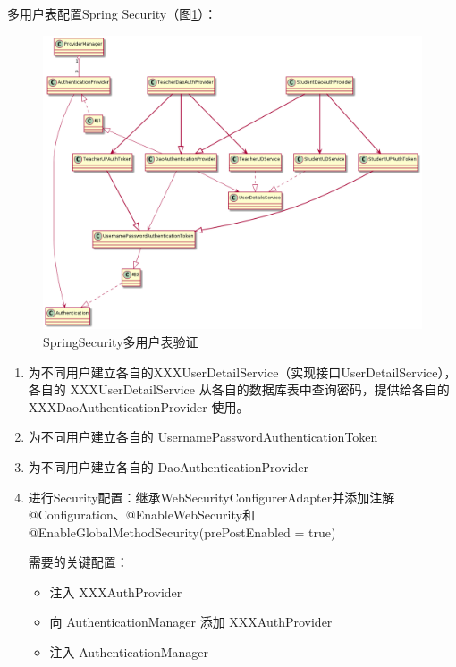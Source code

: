 多用户表配置Spring Security（图\ref{SpringSecurityMultiUser}）：

\begin{figure}[htbp]
  \centering
  \includegraphics[scale = 0.35]{out/uml/类图/Spring Security/SpringSecurity多用户表验证/SpringSecurity多用户表验证.png}
  \caption{\song\wuhao SpringSecurity多用户表验证}
  \label{SpringSecurityMultiUser}
\end{figure}

\begin{enumerate}[label=\circled{\arabic*}]
  \item 为不同用户建立各自的XXXUserDetailService（实现接口UserDetailService），各自的 XXXUserDetailService 从各自的数据库表中查询密码，提供给各自的 XXXDaoAuthenticationProvider 使用。
  \item 为不同用户建立各自的 UsernamePasswordAuthenticationToken
  \item 为不同用户建立各自的 DaoAuthenticationProvider
  \item 进行Security配置：继承WebSecurityConfigurerAdapter并添加注解@Configuration、@EnableWebSecurity和@EnableGlobalMethodSecurity(prePostEnabled = true)

        需要的关键配置：
        \begin{itemize}
          \item 注入 XXXAuthProvider
          \item 向 AuthenticationManager 添加 XXXAuthProvider
          \item 注入 AuthenticationManager
        \end{itemize}
\end{enumerate}

